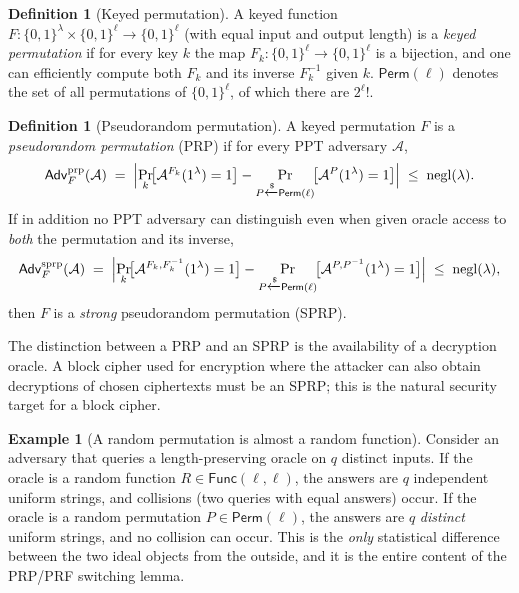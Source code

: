 \documentclass[11pt,a4paper]{article}
\theoremstyle{definition}
\newtheorem{definition}[theorem]{Definition}
\newtheorem{example}[theorem]{Example}
\theoremstyle{remark}
\DeclareMathOperator{\negl}{negl}
\begin{document}
\begin{definition}[Keyed permutation]\label{prf:def:keyedperm}
A keyed function \(F \colon \{0,1\}^{\lambda} \times \{0,1\}^{\ell} \to \{0,1\}^{\ell}\) (with equal input and output length) is a \emph{keyed permutation} if for every key \(k\) the map \(F_k \colon \{0,1\}^{\ell} \to \{0,1\}^{\ell}\) is a bijection, and one can efficiently compute both \(F_k\) and its inverse \(F_k^{-1}\) given \(k\). \(\mathsf{Perm}(\ell)\) denotes the set of all permutations of \(\{0,1\}^{\ell}\), of which there are \(2^{\ell}!\).
\end{definition}

\begin{definition}[Pseudorandom permutation]\label{prf:def:prp}
A keyed permutation \(F\) is a \emph{pseudorandom permutation} (PRP) if for every PPT adversary \(\mathcal{A}\),
\[
  \mathsf{Adv}^{\mathrm{prp}}_{F}(\mathcal{A})
  \;=\;
  \Bigl| \Pr_{k}\!\bigl[\mathcal{A}^{F_k}(1^\lambda)=1\bigr] - \Pr_{P \xleftarrow{\$} \mathsf{Perm}(\ell)}\!\bigl[\mathcal{A}^{P}(1^\lambda)=1\bigr] \Bigr|
  \;\le\; \negl(\lambda).
\]
If in addition no PPT adversary can distinguish even when given oracle access to \emph{both} the permutation and its inverse,
\[
  \mathsf{Adv}^{\mathrm{sprp}}_{F}(\mathcal{A})
  \;=\;
  \Bigl| \Pr_{k}\!\bigl[\mathcal{A}^{F_k, F_k^{-1}}(1^\lambda)=1\bigr] - \Pr_{P \xleftarrow{\$} \mathsf{Perm}(\ell)}\!\bigl[\mathcal{A}^{P, P^{-1}}(1^\lambda)=1\bigr] \Bigr|
  \;\le\; \negl(\lambda),
\]
then \(F\) is a \emph{strong} pseudorandom permutation (SPRP).
\end{definition}

The distinction between a PRP and an SPRP is the availability of a decryption oracle. A block cipher used for encryption where the attacker can also obtain decryptions of chosen ciphertexts must be an SPRP; this is the natural security target for a block cipher.

\begin{example}[A random permutation is almost a random function]\label{prf:exp:permfun}
Consider an adversary that queries a length-preserving oracle on \(q\) distinct inputs. If the oracle is a random function \(R \in \mathsf{Func}(\ell,\ell)\), the answers are \(q\) independent uniform strings, and collisions (two queries with equal answers) occur. If the oracle is a random permutation \(P \in \mathsf{Perm}(\ell)\), the answers are \(q\) \emph{distinct} uniform strings, and no collision can occur. This is the \emph{only} statistical difference between the two ideal objects from the outside, and it is the entire content of the PRP/PRF switching lemma.
\end{example}
\end{document}
